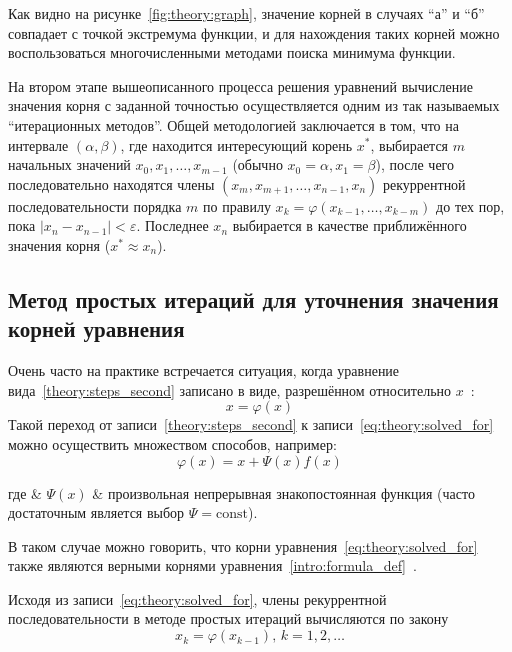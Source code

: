 Как видно на рисунке~\ref{fig:theory:graph}, значение корней в случаях ``а'' и ``б'' совпадает с точкой экстремума функции, и для нахождения таких корней можно воспользоваться
многочисленными методами поиска минимума функции.

На втором этапе вышеописанного процесса решения уравнений вычисление значения корня с заданной точностью осуществляется одним из так называемых ``итерационных методов''. Общей методологией заключается в том, что на интервале $(\alpha, \beta)$, где находится интересующий корень $x^*$, выбирается $m$ начальных значений $x_0, x_1,\dots,x_{m-1}$ (обычно $x_0 = \alpha, x_1 = \beta$), после чего последовательно находятся члены $(x_m, x_{m+1}, \dots, x_{n-1}, x_n)$ рекуррентной последовательности порядка $m$ по правилу $x_k = \varphi(x_{k-1}, \dots, x_{k-m})$ до тех пор, пока $\left|x_n - x_{n-1}\right|<\varepsilon$. Последнее $x_n$ выбирается в качестве приближённого значения корня ($x^* \approx x_n$).

\subsection{Метод простых итераций для уточнения значения корней уравнения}
Очень часто на практике встречается ситуация, когда уравнение вида~\ref{theory:steps_second} записано в виде, разрешённом относительно $x$~\cite[стр. 49]{vich_mat}:
\begin{equation}
	\label{eq:theory:solved_for}
	x=\varphi(x)
\end{equation}
Такой переход от записи~\ref{theory:steps_second} к записи~\ref{eq:theory:solved_for} можно осуществить множеством способов, например:
\begin{equation}
	\label{eq:theory:iter:solve}
	\varphi(x)=x+\Psi(x)f(x)
\end{equation}
\begin{explanation}
	где & $\Psi(x)$ & произвольная непрерывная знакопостоянная функция (часто достаточным является выбор $\Psi = \text{const}$).
\end{explanation}

В таком случае можно говорить, что корни уравнения~\ref{eq:theory:solved_for} также являются верными корнями уравнения~\ref{intro:formula_def}~\cite{vich_mat}.

Исходя из записи~\ref{eq:theory:solved_for}, члены рекуррентной последовательности в методе простых итераций вычисляются по закону
\begin{equation}
	x_k=\varphi(x_{k-1}),\, k=1,2,\dots
\end{equation}

